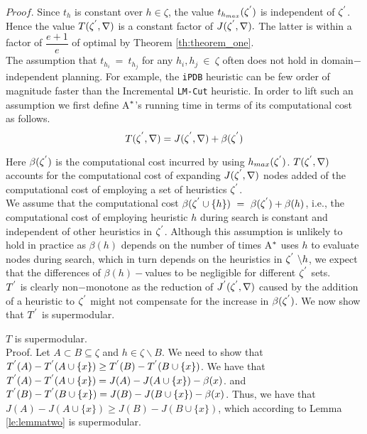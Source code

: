 $Proof.$ Since $t_{h}$ is constant over $h \in \zeta$, the value $t_{h_{max}}(\zeta\sp{'})$ is independent of $\zeta\sp{'}$. Hence the value $T(\zeta\sp{'},\nabla)$ is a constant factor of $J(\zeta\sp{'},\nabla).$ The latter is within a factor of $\dfrac{e+1}{e}$ of optimal by Theorem \ref{th:theorem_one}.\\

The assumption that $t_{h_{i}}\ =\ t_{h_{j}}$ for any $h_{i},h_{j}\ \in\ \zeta$ often does not hold in domain$-$independent planning. For example, the \texttt{iPDB} heuristic \cite{haslum2007domain} can be few order of magnitude faster than the Incremental \texttt{LM-Cut} \cite{helmert2009landmarks} heuristic. In order to lift such an assumption we first define A$\sp{*}$'s running time in terms of its computational cost as follows.\\

\begin{equation}
T(\zeta\sp{'}, \nabla) = J(\zeta\sp{'},\nabla) + \beta(\zeta\sp{'})
\label{eq:eq_cost_eval_time}
\end{equation}

Here $\beta(\zeta\sp{'})$ is the computational cost incurred by using $h_{max}(\zeta\sp{'})$. $T(\zeta\sp{'},\nabla)$ accounts for the computational cost of expanding $J(\zeta\sp{'}, \nabla)$ nodes added of the computational cost of employing a set of heuristics $\zeta\sp{'}$.\\
We assume that the computational cost $\beta(\zeta\sp{'} \cup \{h\})\ =\ \beta(\zeta\sp{'}) + \beta(h)$, \textsf{i.e.,} the computational cost of employing heuristic $h$ during search is constant and independent of other heuristics in $\zeta\sp{'}$. Although this assumption is unlikely to hold in practice as $\beta(h)$ depends on the number of times A$\sp{*}$ uses $h$ to evaluate nodes during search, which in turn depends on the heuristics in $\zeta\sp{'}\ \backslash h$, we expect that the differences of $\beta(h)-$values to be negligible for different $\zeta\sp{'}$ sets.\\

$T\sp{'}$ is clearly non$-$monotone as the reduction of $J\sp{'}(\zeta\sp{'},\nabla)$ caused by the addition of a heuristic to $\zeta\sp{'}$ might not compensate for the increase in $\beta(\zeta\sp{'})$. We now show that $T\sp{'}$ is supermodular.

\begin{lemma}
$T$ is supermodular. \\
Proof. Let $A \subset B \subseteq \zeta$ and $h \in \zeta \backslash B$. We need to show that $T\sp{'}(A) - T\sp{'}(A \cup \{x\}) \geq T\sp{'}(B) - T\sp{'}(B \cup \{x\})$. We have that $T\sp{'}(A)- T\sp{'}(A \cup \{x\}) = J(A)-J(A \cup \{x\}) - \beta(x)$. and $T\sp{'}(B) - T\sp{'}(B \cup \{x\}) = J(B) - J(B \cup \{x\}) - \beta(x)$. Thus, we have that $J(A) - J(A \cup \{x\}) \geq J(B) - J(B \cup \{x\})$, which according to Lemma \ref{le:lemmatwo} is supermodular.
\label{le:lemmathree}
\end{lemma}

